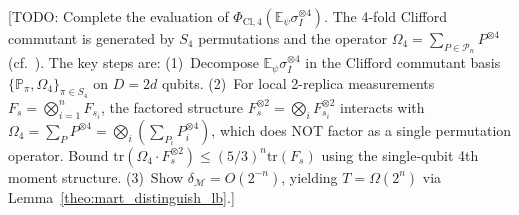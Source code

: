 \documentclass[aps,%
twocolumn,%
floatfix,%
pra,%
amsfonts,%
groupedaddress,%
superscriptaddress]{revtex4-2}%
\newcommand{\1}{\mathbbm{1}}
\begin{document}
[TODO: Complete the evaluation of $\Phi_{\mathrm{Cl},4}(\mathbb{E}_\psi \sigma_I^{\otimes 4})$. The 4-fold Clifford commutant is generated by $S_4$ permutations and the operator $\Omega_4 = \sum_{P \in \mathcal{P}_n} P^{\otimes 4}$ (cf.~\cite{gross2021schur,zhu2016clifford}). The key steps are:
(1)~Decompose $\mathbb{E}_\psi \sigma_I^{\otimes 4}$ in the Clifford commutant basis $\{\mathbb{P}_\pi, \Omega_4\}_{\pi \in S_4}$ on $D = 2d$ qubits.
(2)~For local 2-replica measurements $F_s = \bigotimes_{i=1}^n F_{s_i}$, the factored structure $F_s^{\otimes 2} = \bigotimes_i F_{s_i}^{\otimes 2}$ interacts with $\Omega_4 = \sum_P P^{\otimes 4} = \bigotimes_i (\sum_{P_i} P_i^{\otimes 4})$, which does NOT factor as a single permutation operator. Bound $\mathrm{tr}(\Omega_4 \cdot F_s^{\otimes 2}) \leq (5/3)^n \mathrm{tr}(F_s)$ using the single-qubit 4th moment structure.
(3)~Show $\delta_{\mathcal{M}} = O(2^{-n})$, yielding $T = \Omega(2^n)$ via Lemma~\ref{theo:mart_distinguish_lb}.]
\color{black}


\end{document}
